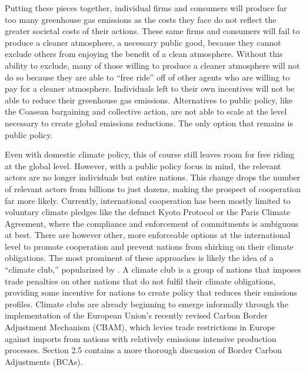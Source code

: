 Putting these pieces together, individual firms and consumers will produce far too many greenhouse gas emissions as the costs they face do not reflect the greater societal costs of their actions. These same firms and consumers will fail to produce a cleaner atmosphere, a necessary public good, because they cannot exclude others from enjoying the benefit of a clean atmosphere. Without this ability to exclude, many of those willing to produce a cleaner atmosphere will not do so because they are able to ``free ride'' off of other agents who are willing to pay for a cleaner atmosphere. Individuals left to their own incentives will not be able to reduce their greenhouse gas emissions. Alternatives to public policy, like the Coasean bargaining and collective action, are not able to scale at the level necessary to create global emissions reductions. The only option that remains is public policy. 

Even with domestic climate policy, this of course still leaves room for free riding at the global level. However, with a public policy focus in mind, the relevant actors are no longer individuals but entire nations. This change drops the number of relevant actors from billions to just dozens, making the prospect of cooperation far more likely. Currently, international cooperation has been mostly limited to voluntary climate pledges like the defunct Kyoto Protocol or the Paris Climate Agreement, where the compliance and enforcement of commitments is ambiguous at best. There are however other, more enforceable options at the international level to promote cooperation and prevent nations from shirking on their climate obligations. The most prominent of these approaches is likely the idea of a ``climate club,'' popularized by \cite{nordhaus2015climate}. A climate club is a group of nations that imposes trade penalties on other nations that do not fulfil their climate obligations, providing some incentive for nations to create policy that reduces their emissions profiles. Climate clubs are already beginning to emerge informally through the implementation of the European Union's recently revised Carbon Border Adjustment Mechanism (CBAM), which levies trade restrictions in Europe against imports from nations with relatively emissions intensive production processes. Section 2.5 contains a more thorough discussion of Border Carbon Adjustments (BCAs).










